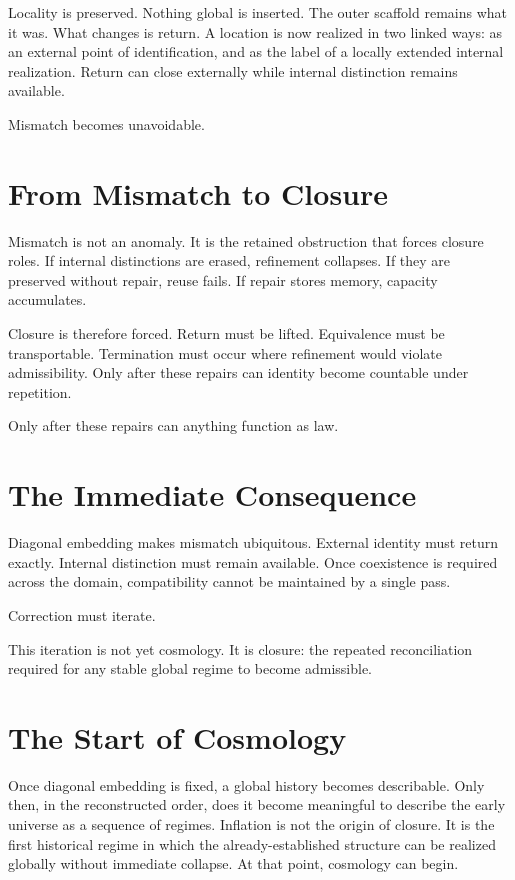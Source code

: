 \documentclass[11pt,twoside,openright]{book}
\begin{document}
Locality is preserved. Nothing global is inserted. The outer scaffold remains what it was. What changes is return. A location is now realized in two linked ways: as an external point of identification, and as the label of a locally extended internal realization. Return can close externally while internal distinction remains available.

Mismatch becomes unavoidable.

\section*{From Mismatch to Closure}

Mismatch is not an anomaly. It is the retained obstruction that forces closure roles. If internal distinctions are erased, refinement collapses. If they are preserved without repair, reuse fails. If repair stores memory, capacity accumulates.

Closure is therefore forced. Return must be lifted. Equivalence must be transportable. Termination must occur where refinement would violate admissibility. Only after these repairs can identity become countable under repetition.

Only after these repairs can anything function as law.

\section*{The Immediate Consequence}

Diagonal embedding makes mismatch ubiquitous. External identity must return exactly. Internal distinction must remain available. Once coexistence is required across the domain, compatibility cannot be maintained by a single pass.

Correction must iterate.

This iteration is not yet cosmology. It is closure: the repeated reconciliation required for any stable global regime to become admissible.

\section*{The Start of Cosmology}

Once diagonal embedding is fixed, a global history becomes describable. Only then, in the reconstructed order, does it become meaningful to describe the early universe as a sequence of regimes. Inflation is not the origin of closure. It is the first historical regime in which the already-established structure can be realized globally without immediate collapse. At that point, cosmology can begin.
\end{document}
